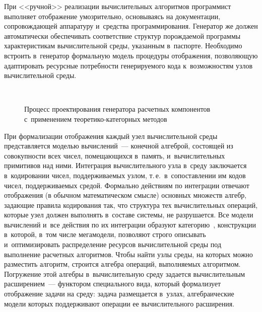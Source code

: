 \begin{multicols}{2}
   При <<ручной>> реализации вычислительных алгоритмов программист 
выполняет отображение умозрительно, основываясь на документации, 
сопровождающей аппаратуру и~средства программирования. Генератор же 
должен автоматически обеспечивать соответствие структур порождаемой 
программы характеристикам вычислительной среды, указанным в~паспорте. 
Необходимо встроить в~генератор формальную модель процедуры 
отоб\-ра\-же\-ния, позволяющую адаптировать ресурсные потребности 
генерируемого кода к~возможностям узлов вычислительной среды.

\begin{figure*} %
 \vspace*{1pt}
 \begin{center}
 \mbox{%
 \epsfxsize=120.068mm
 }
 
\vspace*{6pt}


\noindent
{\small Процесс проектирования генератора расчетных компонентов 
с~применением тео\-ре\-ти\-ко-ка\-те\-гор\-ных методов}
 \end{center}

\vspace*{9pt}

\end{figure*}
   


   При формализации отображения каждый узел вычислительной среды 
представляется моделью вычислений~--- конечной алгеброй, состоящей из 
совокупности всех чисел, помещающихся в~память, и~вычислительных 
примитивов над ними. Интеграция вычислительного узла в~среду заключается 
в~кодировании чисел, поддерживаемых узлом, т.\,е.\ в~сопоставлении им кодов 
чисел, поддерживаемых средой. Формально действиям по интеграции отвечают 
отображения (в обычном математическом смысле) основных множеств алгебр, 
задающие правила кодирования так, что структура тех вычислительных 
операций, которые узел должен выполнять в~составе системы, не разрушается. 
Все модели вычислений и~все действия по их интеграции образуют 
категорию~\cite{26-kov}, конструкции в~которой, в~том числе мегамодели, 
позволяют строго описывать и~оптимизировать распределение ресурсов 
вычислительной среды под выполнение расчетных алгоритмов. Чтобы найти 
узлы среды, на которых можно разместить алгоритм, строится алгебра 
операций, выполняемых алгоритмом. Погружение этой алгебры 
в~вычислительную среду задается вычислительным расширением~--- 
функтором специального вида, который формализует отображение задачи на 
среду: задача размещается в~узлах, алгебраические модели которых 
поддерживают операции ее вычислительного расширения. 


\end{multicols}
